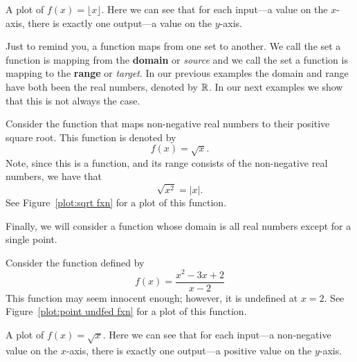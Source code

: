 \begin{marginfigure}[0in]
\caption{A plot of $f(x)=\lfloor x\rfloor$. Here we can see that for each input---a
  value on the $x$-axis, there is exactly one output---a value on the
  $y$-axis.}
\label{plot:greatest-integer fxn}
\end{marginfigure}


Just to remind you, a function maps from one set to another. We call
the set a function is mapping from the \textbf{domain}
or \textit{source} and we call the set a function is mapping to the
\textbf{range} or \textit{target}.  In our previous
examples the domain and range have both been the real numbers, denoted
by $\mathbb{R}$. In our next examples we show that this is not always the
case.


\begin{example}
Consider the function that maps non-negative real numbers to their positive square root. This function is denoted by 
\[
f(x) = \sqrt{x}.
\]
Note, since this is a function, and its range consists of the non-negative real numbers, we have that 
\[
\sqrt{x^2} = |x|.
\]
See Figure~\ref{plot:sqrt fxn} for a plot of this
function.
\end{example}

Finally, we will consider a function whose domain is all real numbers
except for a single point.

\begin{example}
Consider the function defined by 
\[
f(x) = \frac{x^2 - 3x + 2}{x-2}
\]
This function may seem innocent enough; however, it is undefined at
$x=2$. See Figure~\ref{plot:point undfed fxn} for a plot of this function.
\end{example}

\begin{marginfigure}[0in]
\caption{A plot of $f(x)=\sqrt{x}$. Here we can see that for each
  input---a non-negative value on the $x$-axis, there is exactly one
  output---a positive value on the $y$-axis.}
\label{plot:sqrt fxn}
\end{marginfigure}


